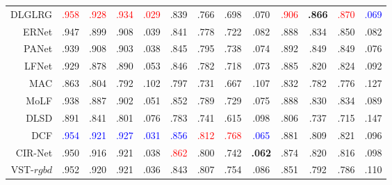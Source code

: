 \begin{table}[!ht]
{\begin{tabular}{rcccccccccccc}
			DLGLRG \cite{liu2021light} 
			& {\textcolor{red}{.958}} & {\textcolor{red}{.928}} 			& {\textcolor{red}{.934}} & {\textcolor{red}{.029}} 
			&	.839 &	.766 &	.698 &	.070 
			&	{\textcolor{red}{.906}} &	\textbf{ {.866}} 			&	{\textcolor{red}{.870}} &	\textcolor{blue}{.069} 
			\\
			
			ERNet \cite{piao2020exploit}
			& .947 & .899 & .908 & .039 
			&	.841 &	.778 &	.722 &	.082 
			&	.888 &	.834 &	.850 &	.082 
			\\
			
			PANet \cite{piao2021panet} 
			& .939 & .908 & .903 & .038 
			& .845 & .795 & .738 & .074 
			& .892 & .849 & .849 & .076
			\\
			
			LFNet	 \cite{zhang2020lfnet} 
			& .929 & .878 & .890 & .053
			&	.846 &	.782 &	.718 &	.073 
			&	.885 &	.820 &	.824 &	.092 \\
			
			MAC	 \cite{zhang2020light} 
			& .863	& .804	& .792	& .102	
			&   .797 & .731 & .667 & .107 
			& .832 & .782 & .776 & .127 \\
			
			MoLF	 \cite{zhang2019memory} 
			& .938 & .887 & .902 & .051 
			&	.852 &	.789 &	.729 &	.075 
			&	.888 &	.830 &	.834 &	.089 \\
			
			DLSD	\cite{piao2019deep}
			& .891	& .841	& .801	& .076	
			&   .783 & .741 & .615 & .098 
			& .806 & .737 & .715 & .147 \\
			
			\midrule %
			
			
			DCF \cite{ji2021calibrated} 
			& \textcolor{blue}{.954} & \textcolor{blue}{.921} & \textcolor{blue}{.927} & \textcolor{blue}{.031} 
			& \textcolor{blue}{.856} & {\textcolor{red}{.812}} & {\textcolor{red}{.768}} & \textcolor{blue}{.065} 
			& .881 & .809 & .821 & .096 \\
			
			CIR-Net \cite{cong2022cir}
			& .950 & .916 & .921 & .038 
			& {\textcolor{red}{.862}} & .800  			& .742 & \textbf{ {.062}} 
			& .874 & .820 & .816 & .098 \\ 
			
			VST-$rgbd$  \cite{liu2021visual} 
			& .952 & .920 & .921 & .036 
			& .843 & .807 & .754 & .086 
			& .851 & .792 & .786 & .110 
			\\
			

\end{tabular}}
\end{table}
